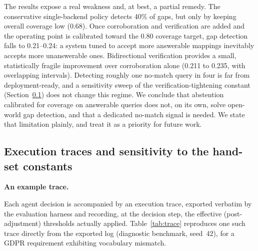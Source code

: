 \documentclass[smallextended,natbib]{svjour3}
\begin{document}
\begin{table}[htbp]
\caption{Open-world gap detection on the diagnostic benchmark (50\% of controls held out; mean $\pm$ 95\% CI over 30 seeds; 4.4 no-match queries per seed, 132 total). Gap detection is the abstention rate on constructed no-match queries, made by removing a requirement's gold controls.}
\label{tab:openworld}
\centering
\setlength{\tabcolsep}{3pt}
\small
{}
\end{table}

The results expose a real weakness and, at best, a partial remedy.
The conservative single-backend policy detects 40\% of gaps, but only by keeping overall coverage low (0.68).
Once corroboration and verification are added and the operating point is calibrated toward the 0.80 coverage target, gap detection falls to 0.21--0.24: a system tuned to accept more answerable mappings inevitably accepts more unanswerable ones.
Bidirectional verification provides a small, statistically fragile improvement over corroboration alone (0.211 to 0.235, with overlapping intervals).
Detecting roughly one no-match query in four is far from deployment-ready, and a sensitivity sweep of the verification-tightening constant (Section~\ref{sec:sensitivity}) does not change this regime.
We conclude that abstention calibrated for coverage on answerable queries does not, on its own, solve open-world gap detection, and that a dedicated no-match signal is needed. We state that limitation plainly, and treat it as a priority for future work.

\subsection{Execution traces and sensitivity to the hand-set constants}
\label{sec:sensitivity}

\noindent\textbf{An example trace.}

Each agent decision is accompanied by an execution trace, exported verbatim by the evaluation harness and recording, at the decision step, the effective (post-adjustment) thresholds actually applied.
Table~\ref{tab:trace} reproduces one such trace directly from the exported log (diagnostic benchmark, seed~42), for a GDPR requirement exhibiting vocabulary mismatch.
\end{document}
